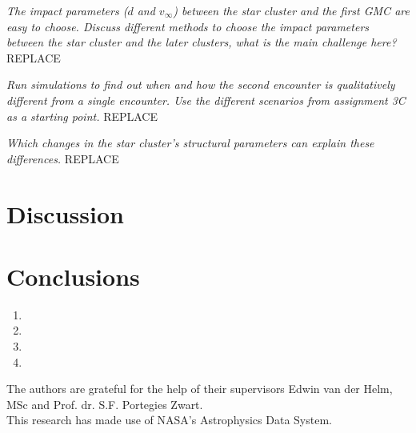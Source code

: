 \documentclass{aa}
\begin{document}
\textit{The impact parameters ($d$ and $v_\infty$) between the star cluster and the first GMC are easy to choose. Discuss different methods to choose the impact parameters between the star cluster and the later clusters, what is the main challenge here?} REPLACE

\textit{Run simulations to find out when and how the second encounter is qualitatively different from a single encounter. Use the different scenarios from assignment 3C as a starting point.} REPLACE

\textit{Which changes in the star cluster's structural parameters can explain these differences.} REPLACE



\section{Discussion}\label{sec:discussion}

\section{Conclusions}\label{sec:conclusions}
\begin{enumerate}
    \item
    \item
    \item
    \item
\end{enumerate}


\begin{acknowledgements}
The authors are grateful for the help of their supervisors Edwin van der Helm, MSc and Prof. dr. S.F. Portegies Zwart. \\

This research has made use of NASA's Astrophysics Data System.
\end{acknowledgements}





\end{document}
